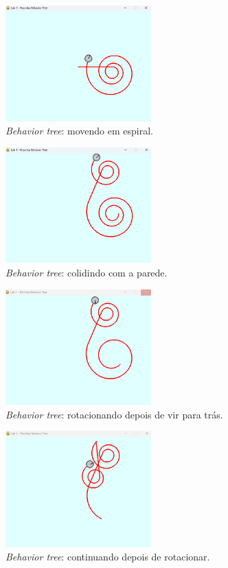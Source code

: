 \documentclass[brazil, 12pt]{article}
\begin{document}
\begin{figure}[H]
	\centering
	\includegraphics[width=0.5\textwidth]{BT_spiral} %
	\caption{\textit{Behavior tree}: movendo em espiral.} %
	\label{fig:BT_spiral}  %
\end{figure}

\begin{figure}[H]
	\centering
	\includegraphics[width=0.5\textwidth]{BT_collide} %
	\caption{\textit{Behavior tree}: colidindo com a parede.} %
	\label{fig:BT_collide}  %
\end{figure}

\begin{figure}[H]
	\centering
	\includegraphics[width=0.5\textwidth]{BT_back_rotate} %
	\caption{\textit{Behavior tree}: rotacionando depois de vir para trás.} %
	\label{fig:BT_back_rotate}  %
\end{figure}

\begin{figure}[H]
	\centering
	\includegraphics[width=0.5\textwidth]{BT_continue} %
	\caption{\textit{Behavior tree}: continuando depois de rotacionar.} %
	\label{fig:BT_continue}  %
\end{figure}
\end{document}
